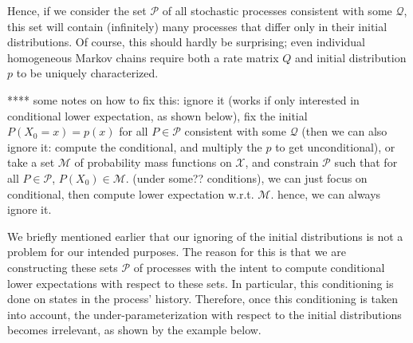 \documentclass[10pt]{paper}
\theoremstyle{definition}
\newcommand{\states}{\mathcal{X}}
\newcommand{\rateset}{\mathcal{Q}}
\begin{document}
Hence, if we consider the set $\mathcal{P}$ of all stochastic processes consistent with some $\rateset$, this set will contain (infinitely) many processes that differ only in their initial distributions. Of course, this should hardly be surprising; even individual homogeneous Markov chains require both a rate matrix $Q$ and initial distribution $p$ to be uniquely characterized. 

**** some notes on how to fix this: ignore it (works if only interested in conditional lower expectation, as shown below), fix the initial $P(X_0=x)=p(x)$ for all $P\in\mathcal{P}$ consistent with some $\rateset$ (then we can also ignore it: compute the conditional, and multiply the $p$ to get unconditional), or take a set $\mathcal{M}$ of probability mass functions on $\states$, and constrain $\mathcal{P}$ such that for all $P\in\mathcal{P}$, $P(X_0)\in\mathcal{M}$. (under some?? conditions), we can just focus on conditional, then compute lower expectation w.r.t. $\mathcal{M}$. hence, we can always ignore it.

We briefly mentioned earlier that our ignoring of the initial distributions is not a problem for our intended purposes. The reason for this is that we are constructing these sets $\mathcal{P}$ of processes with the intent to compute conditional lower expectations with respect to these sets. In particular, this conditioning is done on states in the process' history. Therefore, once this conditioning is taken into account, the under-parameterization with respect to the initial distributions becomes irrelevant, as shown by the example below.
\end{document}
